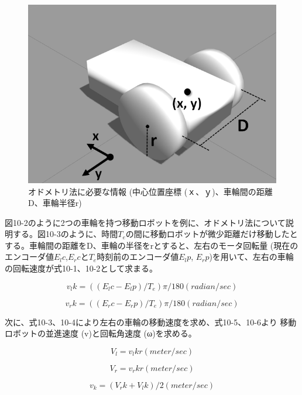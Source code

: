 \begin{figure}[htp]
  \centering
  \includegraphics[width=\columnwidth]{pictures/chapter10/pic_10_02.png}
  \caption{オドメトリ法に必要な情報 (中心位置座標 (ｘ、ｙ)、車輪間の距離D、車輪半径r)}
\end{figure}

図10-2のように2つの車輪を持つ移動ロボットを例に、オドメトリ法について説明する。図10-3のように、時間$T_e$の間に移動ロボットが微少距離だけ移動したとする。車輪間の距離をD、車輪の半径をrとすると、左右のモータ回転量 (現在のエンコーダ値$E_lc$,$E_rc$と$T_e$時刻前のエンコーダ値$E_lp$, $E_rp$)を用いて、左右の車輪の回転速度が式10-1、10-2として求まる。

\begin{equation}
v_lk = ((E_lc-E_lp)/T_e) π/180     (radian/sec)
\end{equation}

\begin{equation}
v_rk = ((E_rc-E_rp)/T_e)π/180     (radian/sec)
\end{equation}

次に、式10-3、10-4により左右の車輪の移動速度を求め、式10-5、10-6より   移動ロボットの並進速度 (v)と回転角速度 (ω)を求める。

\begin{equation}
V_l = v_lk r     (meter/sec)
\end{equation}

\begin{equation}
V_r = v_rk r     (meter/sec)
\end{equation}

\begin{equation}
v_k = (V_rk+V_lk)/2     (meter/sec)
\end{equation}

